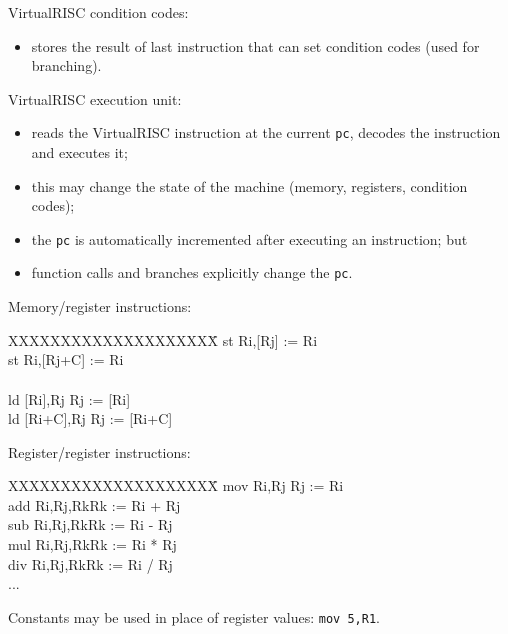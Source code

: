\begin{slide*}
VirtualRISC condition codes:
\begin{itemize}
\item stores the result of last instruction that can
       set condition codes (used for branching).
\end{itemize}

VirtualRISC execution unit:
\begin{itemize}
\item reads the VirtualRISC instruction at the current {\tt pc},
       decodes the instruction and executes it;
\item this may change the state of the machine (memory, registers, condition codes);
\item the {\tt pc} is automatically incremented after executing
    an instruction; but
\item function calls and branches explicitly
    change the {\tt pc}.
\end{itemize}
\vfil
\end{slide*}

\begin{slide*}
Memory/register instructions:\\

\begin{tt}
\begin{tabbing}
XXXXXXXXXXXXXXXXXXXX\=\kill
st Ri,[Rj]    \>[Rj] := Ri\\
st Ri,[Rj+C]  \>[Rj+C] := Ri\\
 \\
ld [Ri],Rj    \>Rj := [Ri]\\
ld [Ri+C],Rj  \>Rj := [Ri+C]\\
\end{tabbing}
\end{tt}

Register/register instructions:\\
 
\begin{tt}
\begin{tabbing}
XXXXXXXXXXXXXXXXXXXX\=\kill
mov Ri,Rj   \>Rj := Ri\\
add Ri,Rj,Rk\>Rk := Ri + Rj\\
sub Ri,Rj,Rk\>Rk := Ri - Rj\\
mul Ri,Rj,Rk\>Rk := Ri * Rj\\
div Ri,Rj,Rk\>Rk := Ri / Rj\\
...\\
\end{tabbing}
\end{tt}

Constants may be used in place of register values: {\tt mov 5,R1}.

\vfil
\end{slide*}

